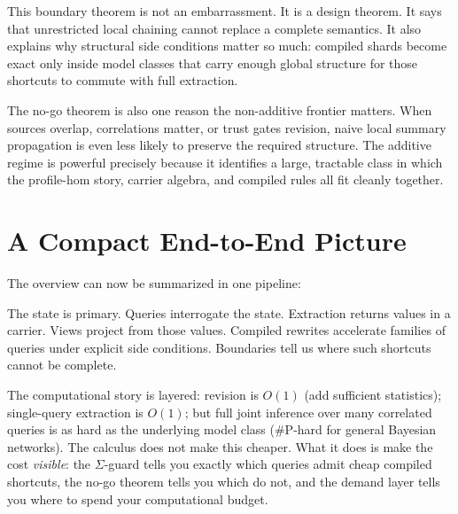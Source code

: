 \documentclass[11pt,openany]{report}
\begin{document}
This boundary theorem is not an embarrassment.  It is a design theorem.  It
says that unrestricted local chaining cannot replace a complete semantics.  It
also explains why structural side conditions matter so much: compiled shards
become exact only inside model classes that carry enough global structure for
those shortcuts to commute with full extraction.

The no-go theorem is also one reason the non-additive frontier matters.  When
sources overlap, correlations matter, or trust gates revision, naive local
summary propagation is even less likely to preserve the required structure.
The additive regime is powerful precisely because it identifies a large,
tractable class in which the profile-hom story, carrier algebra, and compiled
rules all fit cleanly together.

\section{A Compact End-to-End Picture}
\label{sec:overview-end-to-end}

The overview can now be summarized in one pipeline:

\medskip
\noindent
{}
\medskip

The state is primary.  Queries interrogate the state.  Extraction returns values
in a carrier.  Views project from those values.  Compiled rewrites accelerate
families of queries under explicit side conditions.  Boundaries tell us where
such shortcuts cannot be complete.

The computational story is layered: revision is $O(1)$ (add
sufficient statistics); single-query extraction is $O(1)$; but
full joint inference over many correlated queries is as hard as
the underlying model class (\#P-hard for general Bayesian
networks).  The calculus does not make this cheaper.  What it does
is make the cost \emph{visible}: the $\Sigma$-guard tells you
exactly which queries admit cheap compiled shortcuts, the no-go
theorem tells you which do not, and the demand layer tells you
where to spend your computational budget.
\end{document}
